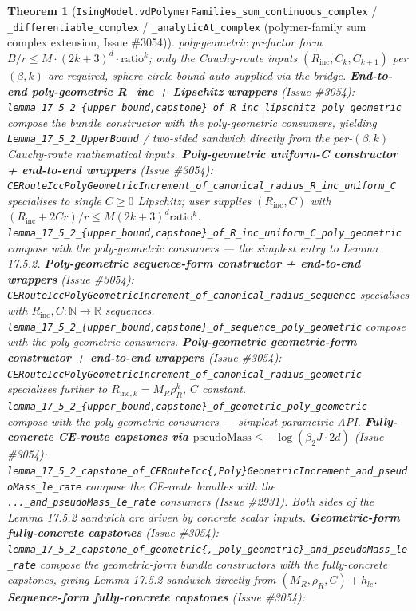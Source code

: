 \documentclass[a4paper,11pt]{article}
\newtheorem{theorem}{Theorem}
\begin{document}
\begin{theorem}[\texttt{IsingModel.vdPolymerFamilies\_sum\_continuous\_complex} /
\texttt{\_differentiable\_complex} / \texttt{\_analyticAt\_complex} (polymer-family sum
complex extension, Issue \#3054)]
poly\(\cdot\)geometric prefactor form
\(B/r\le M\cdot(2k+3)^d\cdot\mathrm{ratio}^k\); only the Cauchy-route
inputs \((R_{\mathrm{inc}}, C_k, C_{k+1})\) per \((\beta, k)\) are
required, sphere circle bound auto-supplied via the bridge.
\textbf{End-to-end poly-geometric R\_inc + Lipschitz wrappers} (Issue \#3054):
\texttt{lemma\_17\_5\_2\_\{upper\_bound,capstone\}\_of\_R\_inc\_lipschitz\_poly\_geometric}
compose the bundle constructor with the poly-geometric consumers, yielding
\texttt{Lemma\_17\_5\_2\_UpperBound} / two-sided sandwich directly from the
per-\((\beta, k)\) Cauchy-route mathematical inputs.
\textbf{Poly-geometric uniform-C constructor + end-to-end wrappers} (Issue \#3054):
\texttt{CERouteIccPolyGeometricIncrement\_of\_canonical\_radius\_R\_inc\_uniform\_C}
specialises to single \(C\ge 0\) Lipschitz; user supplies \((R_{\mathrm{inc}}, C)\)
with \((R_{\mathrm{inc}} + 2Cr)/r \le M(2k+3)^d\mathrm{ratio}^k\).
\texttt{lemma\_17\_5\_2\_\{upper\_bound,capstone\}\_of\_R\_inc\_uniform\_C\_poly\_geometric}
compose with the poly-geometric consumers --- the simplest entry to Lemma 17.5.2.
\textbf{Poly-geometric sequence-form constructor + end-to-end wrappers} (Issue \#3054):
\texttt{CERouteIccPolyGeometricIncrement\_of\_canonical\_radius\_sequence}
specialises with \(R_{\mathrm{inc}}, C : \mathbb{N} \to \mathbb{R}\) sequences.
\texttt{lemma\_17\_5\_2\_\{upper\_bound,capstone\}\_of\_sequence\_poly\_geometric}
compose with the poly-geometric consumers.
\textbf{Poly-geometric geometric-form constructor + end-to-end wrappers} (Issue \#3054):
\texttt{CERouteIccPolyGeometricIncrement\_of\_canonical\_radius\_geometric}
specialises further to \(R_{\mathrm{inc}, k} = M_R \rho_R^k\), \(C\) constant.
\texttt{lemma\_17\_5\_2\_\{upper\_bound,capstone\}\_of\_geometric\_poly\_geometric}
compose with the poly-geometric consumers --- simplest parametric API.
\textbf{Fully-concrete CE-route capstones via \(\mathrm{pseudoMass} \le -\log(\beta_2 J \cdot 2d)\)}
(Issue \#3054):
\texttt{lemma\_17\_5\_2\_capstone\_of\_CERouteIcc\{,Poly\}GeometricIncrement\_and\_pseudoMass\_le\_rate}
compose the CE-route bundles with the
\texttt{...\_and\_pseudoMass\_le\_rate} consumers (Issue \#2931). Both sides of
the Lemma 17.5.2 sandwich are driven by concrete scalar inputs.
\textbf{Geometric-form fully-concrete capstones} (Issue \#3054):
\texttt{lemma\_17\_5\_2\_capstone\_of\_geometric\{,\_poly\_geometric\}\_and\_pseudoMass\_le\_rate}
compose the geometric-form bundle constructors with the fully-concrete capstones,
giving Lemma 17.5.2 sandwich directly from \((M_R, \rho_R, C) + h_{le}\).
\textbf{Sequence-form fully-concrete capstones} (Issue \#3054):

\end{theorem}
\end{document}
